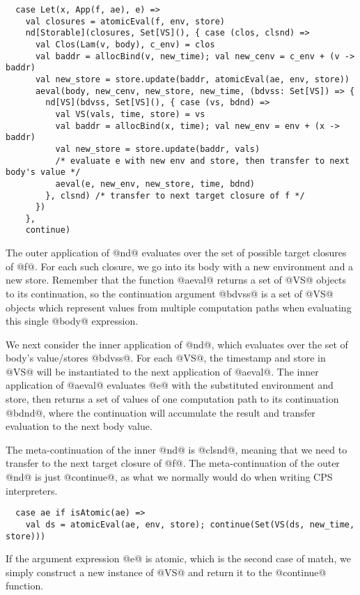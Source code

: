 \documentclass[acmsmall, review]{acmart}\settopmatter{}
\begin{document}
\begin{lstlisting}
  case Let(x, App(f, ae), e) =>
    val closures = atomicEval(f, env, store)
    nd[Storable](closures, Set[VS](), { case (clos, clsnd) =>
      val Clos(Lam(v, body), c_env) = clos
      val baddr = allocBind(v, new_time); val new_cenv = c_env + (v -> baddr)
      val new_store = store.update(baddr, atomicEval(ae, env, store))
      aeval(body, new_cenv, new_store, new_time, (bdvss: Set[VS]) => {
        nd[VS](bdvss, Set[VS](), { case (vs, bdnd) =>
          val VS(vals, time, store) = vs
          val baddr = allocBind(x, time); val new_env = env + (x -> baddr)
          val new_store = store.update(baddr, vals)
          /* evaluate e with new env and store, then transfer to next body's value */
          aeval(e, new_env, new_store, time, bdnd)
        }, clsnd) /* transfer to next target closure of f */
      })
    },
    continue)
\end{lstlisting}

The outer application of @nd@ evaluates over the set of possible target closures of
@f@. For each such closure, we go into its body with a new environment and a new store.
Remember that the function @aeval@ returns a set of @VS@ objects to its continuation,
so the continuation argument @bdvss@ is a set of @VS@ objects which represent values
from multiple computation paths when evaluating this single @body@ expression.

We next consider the inner application of @nd@, which evaluates over the set of body's 
value/stores @bdvss@. For each @VS@, the timestamp and store in @VS@ will be instantiated to
the next application of @aeval@. The inner application of @aeval@ evaluates @e@ with the
substituted environment and store, then returns a set of values of one computation path 
to its continuation @bdnd@, where the continuation will accumulate the result and 
transfer evaluation to the next body value.

The meta-continuation of the inner @nd@ is @clsnd@, meaning that we need to transfer 
to the next target closure of @f@. The meta-continuation of the outer @nd@ is just 
@continue@, as what we normally would do when writing CPS interpreters.

\begin{lstlisting}
  case ae if isAtomic(ae) => 
    val ds = atomicEval(ae, env, store); continue(Set(VS(ds, new_time, store)))
\end{lstlisting}

If the argument expression @e@ is atomic, which is the second case of match, we simply 
construct a new instance of @VS@ and return it to the @continue@ function.
\end{document}

